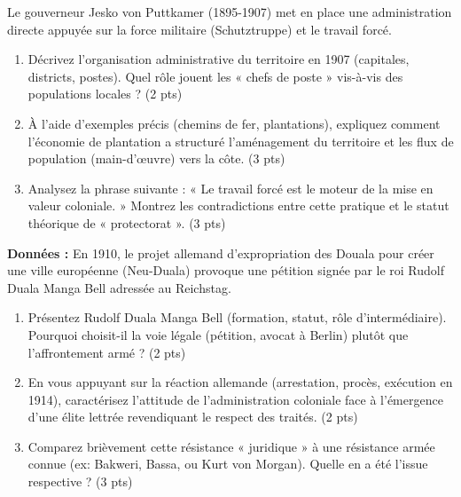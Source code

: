 \documentclass[11pt]{article}
\begin{document}
\begin{exercice}
Le gouverneur Jesko von Puttkamer (1895-1907) met en place une administration directe appuyée sur la force militaire (Schutztruppe) et le travail forcé.

\begin{enumerate}
    \item Décrivez l'organisation administrative du territoire en 1907 (capitales, districts, postes). Quel rôle jouent les « chefs de poste » vis-à-vis des populations locales ? (2 pts)
    \item À l'aide d'exemples précis (chemins de fer, plantations), expliquez comment l'économie de plantation a structuré l'aménagement du territoire et les flux de population (main-d'œuvre) vers la côte. (3 pts)
    \item Analysez la phrase suivante : « Le travail forcé est le moteur de la mise en valeur coloniale. » Montrez les contradictions entre cette pratique et le statut théorique de « protectorat ». (3 pts)
\end{enumerate}
\end{exercice}

\begin{exercice}
\textbf{Données :} En 1910, le projet allemand d'expropriation des Douala pour créer une ville européenne (Neu-Duala) provoque une pétition signée par le roi Rudolf Duala Manga Bell adressée au Reichstag.

\begin{enumerate}
    \item Présentez Rudolf Duala Manga Bell (formation, statut, rôle d'intermédiaire). Pourquoi choisit-il la voie légale (pétition, avocat à Berlin) plutôt que l'affrontement armé ? (2 pts)
    \item En vous appuyant sur la réaction allemande (arrestation, procès, exécution en 1914), caractérisez l'attitude de l'administration coloniale face à l'émergence d'une élite lettrée revendiquant le respect des traités. (2 pts)
    \item Comparez brièvement cette résistance « juridique » à une résistance armée connue (ex: Bakweri, Bassa, ou Kurt von Morgan). Quelle en a été l'issue respective ? (3 pts)
\end{enumerate}
\end{exercice}
\end{document}
